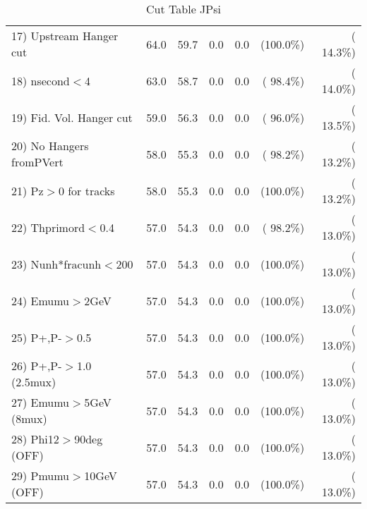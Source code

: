 \begin{table}[h!]
\begin{tabular}{||l||r|r|r|r|r|r||}
 17) Upstream Hanger cut  &         64.0 &         59.7 &          0.0 &          0.0 & (100.0\%) & ( 14.3\%) \\
 18) nsecond$<$4          &         63.0 &         58.7 &          0.0 &          0.0 & ( 98.4\%) & ( 14.0\%) \\
 19) Fid. Vol. Hanger cut &         59.0 &         56.3 &          0.0 &          0.0 & ( 96.0\%) & ( 13.5\%) \\
 20) No Hangers fromPVert &         58.0 &         55.3 &          0.0 &          0.0 & ( 98.2\%) & ( 13.2\%) \\
 21) Pz$>$0 for tracks    &         58.0 &         55.3 &          0.0 &          0.0 & (100.0\%) & ( 13.2\%) \\
 22) Thprimord$<$0.4      &         57.0 &         54.3 &          0.0 &          0.0 & ( 98.2\%) & ( 13.0\%) \\
 23) Nunh*fracunh$<$200   &         57.0 &         54.3 &          0.0 &          0.0 & (100.0\%) & ( 13.0\%) \\
 24) Emumu$>$2GeV         &         57.0 &         54.3 &          0.0 &          0.0 & (100.0\%) & ( 13.0\%) \\
 25) P+,P-$>$0.5          &         57.0 &         54.3 &          0.0 &          0.0 & (100.0\%) & ( 13.0\%) \\
 26) P+,P-$>$1.0 (2.5mux) &         57.0 &         54.3 &          0.0 &          0.0 & (100.0\%) & ( 13.0\%) \\
 27) Emumu$>$5GeV  (8mux) &         57.0 &         54.3 &          0.0 &          0.0 & (100.0\%) & ( 13.0\%) \\
 28) Phi12$>$90deg  (OFF) &         57.0 &         54.3 &          0.0 &          0.0 & (100.0\%) & ( 13.0\%) \\
 29) Pmumu$>$10GeV  (OFF) &         57.0 &         54.3 &          0.0 &          0.0 & (100.0\%) & ( 13.0\%) \\
 \hline
 \hline
 \end{tabular}
 \caption{Cut Table  JPsi     }
 \label{tab-cutcohjpsi-mumu_jpsi}
 \end{table}
